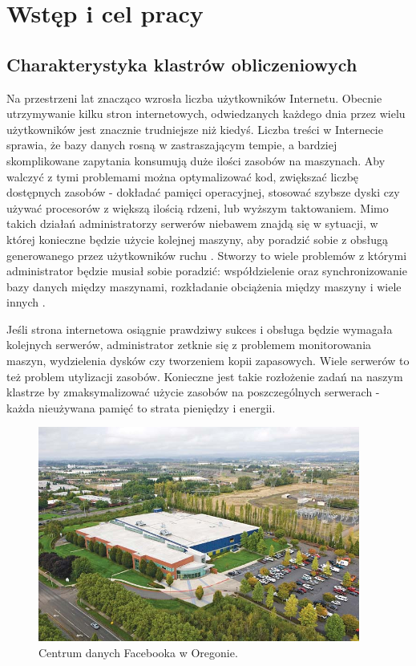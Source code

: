 \documentclass[10pt,a4paper,titlepage,twoside]{report}
\begin{document}
\newpage
{}
\onehalfspacing

\chapter{Wstęp i cel pracy}
\section{Charakterystyka klastrów obliczeniowych}
\indent \indent Na przestrzeni lat znacząco wzrosła liczba użytkowników Internetu\cite{ad1}. Obecnie utrzymywanie kilku stron internetowych, odwiedzanych każdego dnia przez wielu użytkowników jest znacznie trudniejsze niż kiedyś\cite{ad1}. Liczba treści w Internecie sprawia, że bazy danych rosną w zastraszającym tempie, a bardziej skomplikowane zapytania konsumują duże ilości zasobów na maszynach. Aby walczyć z tymi problemami można optymalizować kod, zwiększać liczbę dostępnych zasobów - dokładać pamięci operacyjnej, stosować szybsze dyski czy używać procesorów z większą ilością rdzeni, lub wyższym taktowaniem. Mimo takich działań administratorzy serwerów niebawem znajdą się w sytuacji, w której konieczne będzie użycie kolejnej maszyny, aby poradzić sobie z obsługą generowanego przez użytkowników ruchu \cite{ad2}. Stworzy to wiele problemów z którymi administrator będzie musiał sobie poradzić: współdzielenie oraz synchronizowanie bazy danych między maszynami, rozkładanie obciążenia między maszyny i wiele innych \cite{ad2}.

Jeśli strona internetowa osiągnie prawdziwy sukces i obsługa będzie wymagała kolejnych serwerów, administrator zetknie się z problemem monitorowania maszyn, wydzielenia dysków czy tworzeniem kopii zapasowych. Wiele serwerów to też problem utylizacji zasobów. Konieczne jest takie rozłożenie zadań na naszym klastrze by zmaksymalizować użycie zasobów na poszczególnych serwerach - każda nieużywana pamięć to strata pieniędzy i energii\cite{ad3}.

\begin{figure}[ht!]
	\centering
	\includegraphics[scale=0.7]{pics/Selection_615.png}
	\caption{Centrum danych Facebooka w Oregonie.}
	\label{facebook_dc}
\end{figure}
\end{document}
